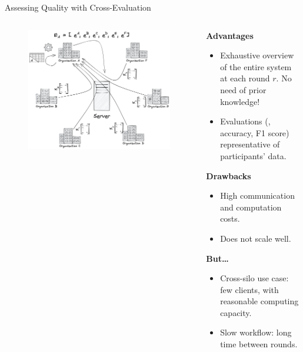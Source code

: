 \begin{frame}{Assessing Quality with Cross-Evaluation}

  \begin{columns}
    \begin{column}{.45\textwidth}
      \begin{figure}
        \centering
        \includegraphics[width=\textwidth]{figures/radar/xeval}
      \end{figure}
    \end{column}
    
    \begin{column}{.55\textwidth}
      \small
      \setlength{\baselineskip}{0.8\baselineskip}
      \vspace{1ex}

      \textbf{Advantages}
      \begin{itemize}
        \item Exhaustive overview of the entire system at each round $r$. \alert{No need of prior knowledge!}
        \item Evaluations (\eg, accuracy, F1 score) representative of participants' data.
      \end{itemize}
      \medskip
      \pause
      \textbf{Drawbacks}
      \begin{itemize}
        \item High communication and computation costs.
        \item Does not scale well.
      \end{itemize}
      \medskip
      \pause
      \textbf{But\dots}
      \begin{itemize}
        \item Cross-silo use case: few clients, with reasonable computing capacity.
        \item Slow workflow: long time between rounds.
      \end{itemize}
    \end{column}


\end{columns}
\end{frame}
